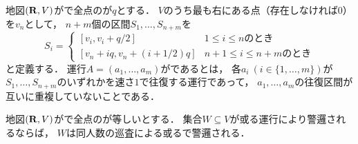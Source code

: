 \begin{defi}
  \label{defi:independentSectionOperation}
  地図$(\mathbf R, V)$が{\graphLine}で全点の{\maxIdletime}が$q$とする．
  $V$のうち最も右にある点（存在しなければ$0$）を$v_n$として，
  $n + m$個の区間$S_1, \ldots, S_{n + m}$を
  \begin{equation}
    \label{equation: candidate segments}
    S_i
    =
    \begin{cases}
      [v_i, v_i + q/2] & \text{$1 \leq i \leq n $のとき} \\
      [v_n + iq, v_n + (i + 1/2)q] & \text{$n + 1 \leq i \leq n + m$のとき}
    \end{cases}
  \end{equation}
  と定義する．
  運行$A = (a_1, \ldots, a_m)$がであるとは，
  各$a_i\ (i \in \{ 1, \ldots, m \})$が
  $S_1, \ldots, S_{n + m}$のいずれかを速さ$1$で往復する運行であって，
  $a_1, \ldots, a_m$の往復区間が互いに重複していないことである．
\end{defi}


\begin{lemm}
  \label{lemm:LineUnaryIdletimeIndependentInterval}
  地図$(\mathbf R, V)$が{\graphLine}で全点の{\maxIdletime}が等しいとする．
  集合$W \subseteq V$が或る運行により警邏されるならば，
  $W$は同人数の巡査による或る{\sepSectPatroll}で警邏される．
\end{lemm}

